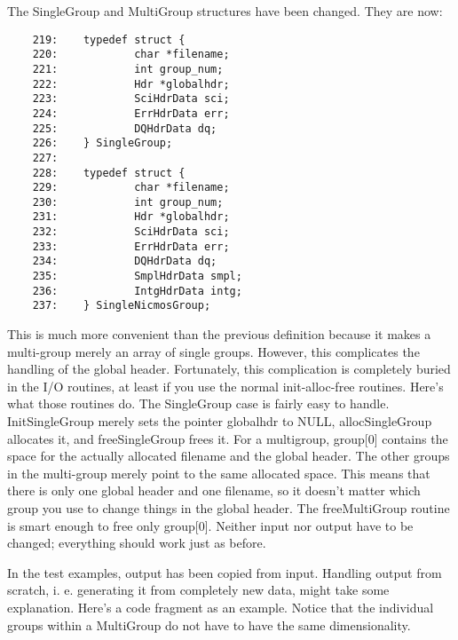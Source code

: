 The SingleGroup and MultiGroup structures have been changed.  They
are now:

\begin{scriptsize}
\begin{verbatim}
    219:    typedef struct {
    220:            char *filename;
    221:            int group_num;
    222:            Hdr *globalhdr;
    223:            SciHdrData sci;
    224:            ErrHdrData err;
    225:            DQHdrData dq;
    226:    } SingleGroup;
    227:    
    228:    typedef struct {
    229:            char *filename;
    230:            int group_num;
    231:            Hdr *globalhdr;
    232:            SciHdrData sci;
    233:            ErrHdrData err;
    234:            DQHdrData dq;
    235:            SmplHdrData smpl;
    236:            IntgHdrData intg;
    237:    } SingleNicmosGroup;
\end{verbatim}
\end{scriptsize}

This is much more convenient than the previous definition because it
makes a multi-group merely an array of single groups.  However, this
complicates the handling of the global header.  Fortunately, this
complication is completely buried in the I/O routines, at least if you
use the normal init-alloc-free routines.  Here's what those routines do. 
The SingleGroup case is fairly easy to handle.  InitSingleGroup merely
sets the pointer globalhdr to NULL, allocSingleGroup allocates it, and
freeSingleGroup frees it.  For a multigroup, group[0] contains the space
for the actually allocated filename and the global header.  The other
groups in the multi-group merely point to the same allocated space. 
This means that there is only one global header and one filename, so it
doesn't matter which group you use to change things in the global header. 
The freeMultiGroup routine is smart enough to free only group[0].
Neither input nor output have to be changed; everything should work
just as before.

In the test examples, output has been copied from input.  Handling
output from scratch, i.  e.  generating it from completely new data,
might take some explanation.  Here's a code fragment as an example.
Notice that the individual groups within a MultiGroup do not have to
have the same dimensionality.

